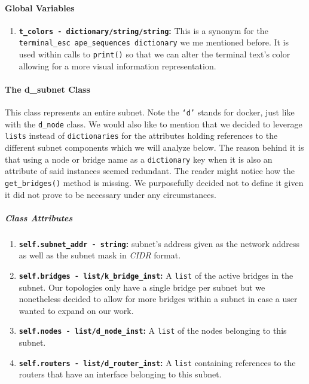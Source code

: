     \paragraph{Global Variables}
        \begin{enumerate}
            \item \textbf{\texttt{\allowbreak t\_colors - dictionary/string/string}:} This is a synonym for the \texttt{\allowbreak terminal\_esc ape\_sequences dictionary} we me mentioned before. It is used within calls to \texttt{print()} so that we can alter the terminal text's color allowing for a more visual information representation.
        \end{enumerate}

    \paragraph{The d\_subnet Class}
        This class represents an entire subnet. Note the \texttt{`d'} stands for docker, just like with the \texttt{d\_node} class. We would also like to mention that we decided to leverage \texttt{lists} instead of \texttt{dictionaries} for the attributes holding references to the different subnet components which we will analyze below. The reason behind it is that using a node or bridge name as a \texttt{dictionary} key when it is also an attribute of said instances seemed redundant. The reader might notice how the \texttt{get\_bridges()} method is missing. We purposefully decided not to define it given it did not prove to be necessary under any circumstances.

        \subparagraph{Class Attributes}
            \begin{enumerate}
                \item \textbf{\texttt{self.subnet\_addr - string}:} subnet's address given as the network address as well as the subnet mask in \textit{CIDR} format.
                \item \textbf{\texttt{self.bridges - list/k\_bridge\_inst}:} A \texttt{list} of the active bridges in the subnet. Our topologies only have a single bridge per subnet but we nonetheless decided to allow for more bridges within a subnet in case a user wanted to expand on our work.
                \item \textbf{\texttt{self.nodes - list/d\_node\_inst}:} A \texttt{list} of the nodes belonging to this subnet.
                \item \textbf{\texttt{self.routers - list/d\_router\_inst}:} A \texttt{list} containing references to the routers that have an interface belonging to this subnet.
            \end{enumerate}

